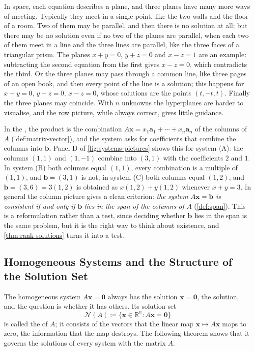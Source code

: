 In space, each equation describes a plane, and three planes have many more ways of meeting. Typically they meet in a single point, like the two walls and the floor of a room. Two of them may be parallel, and then there is no solution at all; but there may be no solution even if no two of the planes are parallel, when each two of them meet in a line and the three lines are parallel, like the three faces of a triangular prism. The planes $x+y=0$, $y+z=0$ and $x-z=1$ are an example: subtracting the second equation from the first gives $x-z=0$, which contradicts the third. Or the three planes may pass through a common line, like three pages of an open book, and then every point of the line is a solution; this happens for $x+y=0$, $y+z=0$, $x-z=0$, whose solutions are the points $(t,-t,t)$. Finally the three planes may coincide. With $n$ unknowns the hyperplanes are harder to visualise, and the row picture, while always correct, gives little guidance.

In the , the product is the combination $A\mathbf x=x_1\mathbf a_1+\cdots+x_n\mathbf a_n$ of the columns of $A$ (\cref{def:matrix-vector}), and the system asks for coefficients that combine the columns into $\mathbf b$. Panel D of \cref{fig:systems-pictures} shows this for system (A): the columns $(1,1)$ and $(1,-1)$ combine into $(3,1)$ with the coefficients $2$ and $1$. In system (B) both columns equal $(1,1)$, every combination is a multiple of $(1,1)$, and $\mathbf b=(3,1)$ is not; in system (C) both columns equal $(1,2)$, and $\mathbf b=(3,6)=3(1,2)$ is obtained as $x(1,2)+y(1,2)$ whenever $x+y=3$. In general the column picture gives a clean criterion: \emph{the system $A\mathbf x=\mathbf b$ is consistent if and only if $\mathbf b$ lies in the span of the columns of $A$} (\cref{def:span}). This is a reformulation rather than a test, since deciding whether $\mathbf b$ lies in the span is the same problem, but it is the right way to think about existence, and \cref{thm:rank-solutions} turns it into a test.

\subsection{Homogeneous Systems and the Structure of the Solution Set}

The homogeneous system $A\mathbf x=\mathbf 0$ always has the solution $\mathbf x=\mathbf 0$, the  solution, and the question is whether it has others. Its solution set
\[
\mathcal N(A)\coloneqq\{\mathbf x\in\mathbb R^n: A\mathbf x=\mathbf 0\}
\]
is called the  of $A$; it consists of the vectors that the linear map $\mathbf x\mapsto A\mathbf x$ maps to zero, the information that the map destroys. The following theorem shows that it governs the solutions of every system with the matrix $A$.

